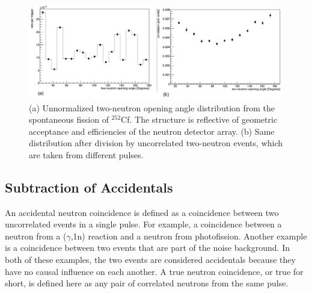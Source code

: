 \begin{figure}
    \centering
    \includegraphics[width  = \textwidth ]{Content/Methods/Normalization.png}
    \caption{(a) Unnormalized two-neutron opening angle distribution from the spontaneous fission of $^{252}$Cf. The structure is reflective of geometric acceptance and efficiencies of the neutron detector array. (b) Same distribution after division by uncorrelated two-neutron events, which are taken from different pulses.}
    \label{fig:OpeningAngleAcceptance}
    \label{fig:OpeningAngleAcceptance}
\end{figure}

\subsection{Subtraction of Accidentals}
\label{Subtraction of Accidentals}
An accidental neutron coincidence is defined as a coincidence between two uncorrelated events in a single pulse.
For example, a coincidence between a neutron from a ($\gamma$,1n) reaction and a neutron from photofission.
Another example is a coincidence between two events that are part of the noise background.
In both of these examples, the two events are considered accidentals because they have no causal influence on each another.
A true neutron coincidence, or true for short, is defined here as any pair of correlated neutrons from the same pulse.


